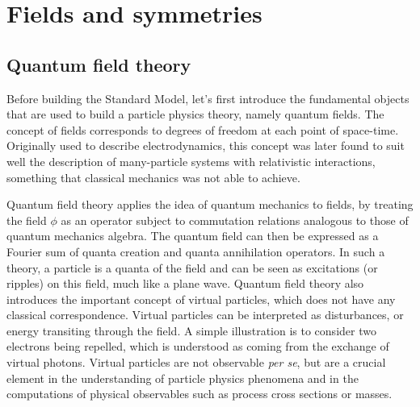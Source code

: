     \section{Fields and symmetries \label{sec:fieldsAndSymmetries}}

        \subsection{Quantum field theory}

    Before building the Standard Model, let's first introduce the fundamental
    objects that are used to build a particle physics theory, namely quantum
    fields. The concept of fields corresponds to degrees of freedom at each
    point of space-time. Originally used to describe electrodynamics, this
    concept was later found to suit well the description of many-particle
    systems with relativistic interactions, something that classical mechanics
    was not able to achieve.

    Quantum field theory \cite{Polonyi, Ryder} applies the idea of quantum
    mechanics to fields, by treating the field $\phi$ as an operator subject to
    commutation relations analogous to those of quantum mechanics algebra. The
    quantum field can then be expressed as a Fourier sum of quanta creation and
    quanta annihilation operators. In such a theory, a particle is a quanta of
    the field and can be seen as excitations (or ripples) on this field, much
    like a plane wave.  Quantum field theory also introduces the important
    concept of virtual particles, which does not have any classical
    correspondence. Virtual particles can be interpreted as disturbances, or
    energy transiting through the field. A simple illustration is to consider
    two electrons being repelled, which is understood as coming from the
    exchange of virtual photons. Virtual particles are not observable \emph{per
    se}, but are a crucial element in the understanding of particle physics
    phenomena and in the computations of physical observables such as process
    cross sections or masses.

